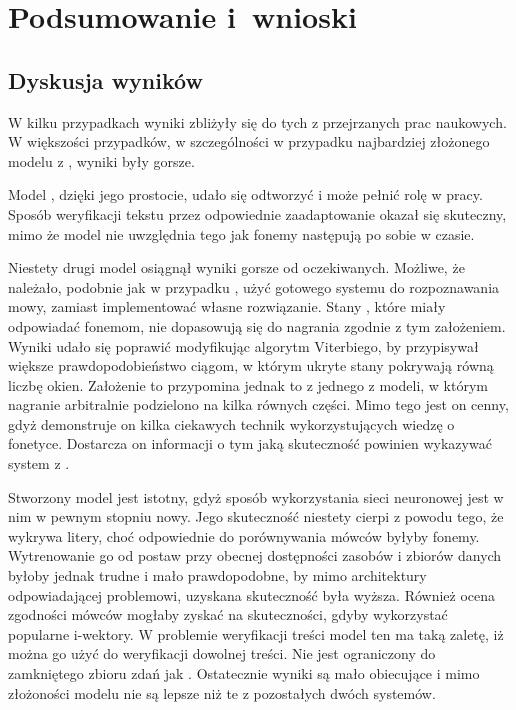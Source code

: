 \chapter{Podsumowanie i~wnioski}\label{chap:podsumowanie}

\section{Dyskusja wyników}

W kilku przypadkach wyniki zbliżyły się do tych z przejrzanych prac naukowych. W większości przypadków,
w szczególności w przypadku najbardziej złożonego modelu z , wyniki były gorsze.

Model , dzięki jego prostocie, udało się odtworzyć i może pełnić
rolę  w pracy. Sposób weryfikacji tekstu przez odpowiednie zaadaptowanie 
okazał się skuteczny, mimo że model nie uwzględnia tego jak fonemy następują po sobie w czasie.

Niestety drugi model  osiągnął wyniki gorsze od oczekiwanych.
Możliwe, że należało, podobnie jak w przypadku , użyć gotowego systemu do rozpoznawania mowy,
zamiast implementować własne rozwiązanie.
Stany , które miały odpowiadać fonemom, nie dopasowują się do nagrania zgodnie z tym założeniem.
Wyniki udało się poprawić modyfikując algorytm Viterbiego, by przypisywał większe prawdopodobieństwo
ciągom, w którym ukryte stany pokrywają równą liczbę okien. Założenie to przypomina jednak to z jednego
z modeli, w którym nagranie arbitralnie podzielono na kilka równych części. Mimo tego jest on cenny,
gdyż demonstruje on kilka ciekawych technik wykorzystujących wiedzę o fonetyce. Dostarcza on informacji
o tym jaką skuteczność powinien wykazywać system z .

Stworzony model  jest istotny, gdyż sposób wykorzystania sieci neuronowej jest w nim
w pewnym stopniu nowy. Jego skuteczność niestety cierpi z powodu tego, że 
wykrywa litery, choć odpowiednie do porównywania mówców byłyby fonemy. Wytrenowanie go od postaw przy
obecnej dostępności zasobów i zbiorów danych byłoby jednak trudne i mało prawdopodobne, by mimo
architektury odpowiadającej problemowi, uzyskana skuteczność była wyższa.
Również ocena zgodności mówców mogłaby zyskać na skuteczności, gdyby wykorzystać popularne i-wektory.
W problemie weryfikacji treści model ten ma taką zaletę, iż można go użyć do weryfikacji
dowolnej treści. Nie jest ograniczony do zamkniętego zbioru zdań jak .
Ostatecznie wyniki są mało obiecujące i mimo złożoności modelu nie są lepsze niż te
z pozostałych dwóch systemów.

